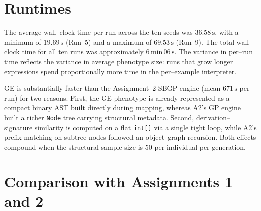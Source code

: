 \documentclass[12pt,a4paper]{article}
\begin{document}
\section{Runtimes}

The average wall--clock time per run across the ten seeds was
$36.58\,\text{s}$, with a minimum of $19.69\,\text{s}$ (Run~5) and a
maximum of $69.53\,\text{s}$ (Run~9). The total wall--clock time for
all ten runs was approximately $6\,\text{min}\,06\,\text{s}$. The
variance in per--run time reflects the variance in average phenotype
size: runs that grow longer expressions spend proportionally more time
in the per--example interpreter.

GE is substantially faster than the Assignment~2 SBGP engine (mean
$671\,\text{s}$ per run) for two reasons. First, the GE phenotype is
already represented as a compact binary AST built directly during
mapping, whereas A2's GP engine built a richer \texttt{Node} tree
carrying structural metadata. Second, derivation--signature similarity
is computed on a flat \texttt{int[]} via a single tight loop, while
A2's prefix matching on subtree nodes followed an object--graph
recursion. Both effects compound when the structural sample size is
$50$ per individual per generation.

\section{Comparison with Assignments 1 and 2}

\begin{table}[H]
\centering
{}
\caption{End--to--end comparison across the three assignments. All three
were trained on the same $79{,}994$ examples and tested on the same
$19{,}999$ examples with identical seeds.}
\end{table}
\end{document}
